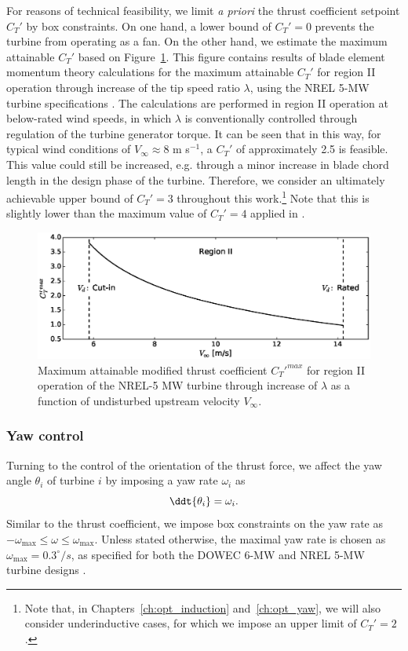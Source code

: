 For reasons of technical feasibility, we limit \emph{a priori} the thrust coefficient setpoint $C_T'$ by box constraints. On one hand, a lower bound of $C_T' = 0$ prevents the turbine from operating as a fan. On the other hand, we estimate the maximum attainable $C_T'$ based on Figure~\ref{fig:Ct_Uinfty}. This figure contains results of blade element momentum theory calculations for the maximum attainable $C_T'$ for region II operation through increase of the tip speed ratio $\lambda$, using the NREL 5-MW turbine specifications \citep{jonkman2009definition}. The calculations are performed in region II operation at below-rated wind speeds, in which $\lambda$ is conventionally controlled through regulation of the turbine generator torque. It can be seen that in this way, for typical wind conditions of $V_\infty \approx 8$ m s$^{-1}$, a $C_T'$ of approximately 2.5 is feasible. This value could still be increased, e.g. through a minor increase in blade chord length in the design phase of the turbine. Therefore, we consider an ultimately achievable upper bound of $C_T' = 3$ throughout this work.\footnote{Note that, in Chapters~\ref{ch:opt_induction} and~\ref{ch:opt_yaw}, we will also consider underinductive cases, for which we impose an upper limit of  $C_T' = 2$.} Note that this is slightly lower than the maximum value of $C_T' = 4$ applied in \cite{goit2015optimal}.

\begin{figure}
	\centering
	\includegraphics[width=0.9\linewidth]{chapters/methodology/figure7.eps} 	
	\caption{Maximum attainable modified thrust coefficient $C_T'^{max}$ for region II operation of the NREL-5 MW turbine through increase of $\lambda$ as a function of undisturbed upstream velocity $V_\infty$.}\label{fig:Ct_Uinfty}
\end{figure}

\subsubsection{Yaw control}
Turning to the control of the orientation of the thrust force, we affect the yaw angle $\theta_i$ of turbine $i$ by imposing a yaw rate $\omega_i$ as 
\begin{equation}
\ddt{\theta_i} = \omega_i \label{eq:omega_def}.
\end{equation}
Similar to the thrust coefficient, we impose box constraints on the yaw rate as $-\omega_{\text{max}} \leq \omega \leq \omega_{\text{max}}$. Unless stated otherwise, the maximal yaw rate is chosen as $\omega_{\text{max}} = 0.3^\circ/s$, as specified for both the DOWEC 6-MW and NREL 5-MW turbine designs \citep{Kooijman2003, jonkman2009definition}.

